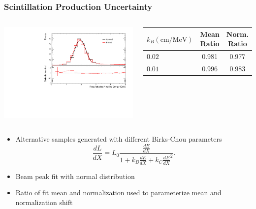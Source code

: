 \documentclass[10pt,professionalfonts,xcolor=table]{beamer}
\begin{document}
\begin{frame}
\frametitle{Scintillation Production Uncertainty}
\begin{columns}[c]


\includegraphics[angle=-90, width=\textwidth]{figures/systs/params/fd_birksb.pdf}


\begin{center}
\begin{tabular}{|l|c|c|}
\hline
$k_B (\text{cm} / \text{MeV})$ & Mean Ratio & Norm. Ratio \\ \hline
$0.02 $ & 0.981 & 0.977  \\ \hline
$0.01 $ & 0.996 & 0.983  \\ \hline
\end{tabular}
\end{center}




\end{columns}

\begin{itemize}
\item Alternative samples generated with different Birks-Chou parameters
\begin{equation}
\frac{dL}{dX} = L_0  \frac{\frac{dE}{dX}}{1+ k_B \frac{dE}{dX} + k_C \frac{dE}{dX}^2}.
\end{equation}
\item Beam peak fit with normal distribution
\item Ratio of fit mean and normalization used to parameterize mean and normalization shift
\end{itemize}

\end{frame}
\end{document}
